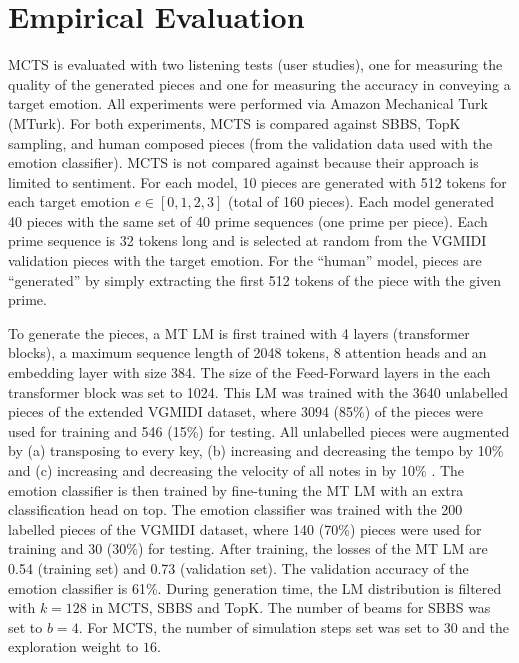 \section{Empirical Evaluation}

MCTS is evaluated with two listening tests (user studies), one for measuring the quality of the generated pieces and one for measuring the accuracy in conveying a target emotion. All experiments were performed via Amazon Mechanical Turk (MTurk). For both experiments, MCTS is compared against SBBS, TopK sampling, and human composed pieces (from the validation data used with the emotion classifier). MCTS is not compared against \citet{ferreira_2019} because their approach is limited to sentiment. For each model, 10 pieces are generated with 512 tokens for each target emotion $e \in [0, 1, 2, 3]$ (total of 160 pieces). Each model generated 40 pieces with the same set of 40 prime sequences (one prime per piece). Each prime sequence is 32 tokens long and is selected at random from the VGMIDI validation pieces with the target emotion. For the ``human'' model, pieces are ``generated'' by simply extracting the first 512 tokens of the piece with the given prime.

To generate the pieces, a MT LM is first trained with 4 layers (transformer blocks), a maximum sequence length of 2048 tokens, 8 attention heads and an embedding layer with size 384. The size of the Feed-Forward layers in the each transformer block was set to 1024. This LM was trained with the 3640 unlabelled pieces of the extended VGMIDI dataset, where 3094 (85\%) of the pieces were used for training and 546 (15\%) for testing. All unlabelled pieces were augmented by (a) transposing to every key, (b) increasing and decreasing the tempo by 10\% and (c) increasing and decreasing the velocity of all notes in by 10\% \cite{oore2017learning}. The emotion classifier is then trained by fine-tuning the MT LM with an extra classification head on top. The emotion classifier was trained with the 200 labelled pieces of the VGMIDI dataset, where 140 (70\%) pieces were used for training and 30 (30\%) for testing. After training, the losses of the MT LM are 0.54 (training set) and 0.73 (validation set). The validation accuracy of the emotion classifier is 61\%. During generation time, the LM distribution is filtered with $k = 128$ in MCTS, SBBS and TopK. The number of beams for SBBS was set to $b = 4$. For MCTS, the number of simulation steps set was set to $30$ and the exploration weight to $16$.


